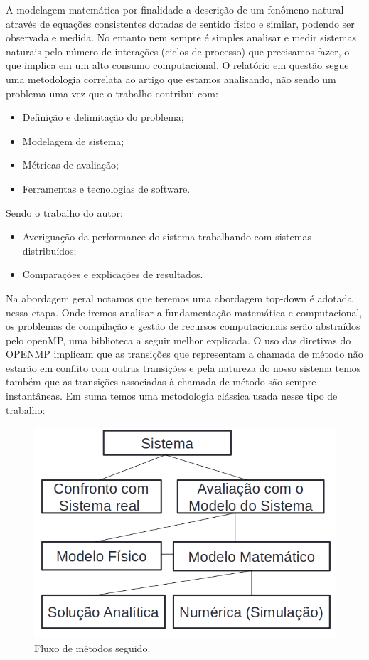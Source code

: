 \documentclass[letterpaper, 10 pt, conference]{ieeeconf}
\begin{document}
A modelagem matemática por finalidade a descrição de um fenômeno natural através de equações consistentes dotadas de 
sentido físico e similar, podendo ser observada e medida. No entanto nem sempre é simples analisar e medir sistemas 
naturais pelo número de interações (ciclos de processo) que precisamos fazer, o que implica em um alto consumo 
computacional. 
O relatório em questão segue uma metodologia correlata ao artigo que estamos analisando, não sendo um problema uma vez que 
o trabalho contribui com: \\

\begin{itemize}
    \item Definição e delimitação do problema;
    \item Modelagem de sistema;
    \item Métricas de avaliação;
    \item Ferramentas e tecnologias de software.\\
\end{itemize}
	Sendo o trabalho do autor:
\begin{itemize}
    \item Averiguação da performance do sistema trabalhando com sistemas distribuídos;
    \item Comparações e explicações de resultados.\\
\end{itemize}

Na abordagem geral notamos que teremos uma abordagem top-down é adotada nessa etapa. Onde iremos  analisar a fundamentação 
matemática e computacional, os problemas de compilação e gestão de recursos computacionais serão abstraídos pelo openMP, 
uma biblioteca a seguir melhor explicada. O uso das diretivas do OPENMP implicam que as transições que representam a 
chamada de método não estarão em conflito com outras transições e pela natureza do nosso sistema temos também que as 
transições associadas à chamada de método são sempre instantâneas.
Em suma temos uma metodologia clássica usada nesse tipo de trabalho:

\begin{figure}[htbp]
\centering
\includegraphics[width=0.97\columnwidth]{Figuras/img1.png}
\caption{Fluxo de métodos seguido.}
\label{stability}
\end{figure}
\end{document}
